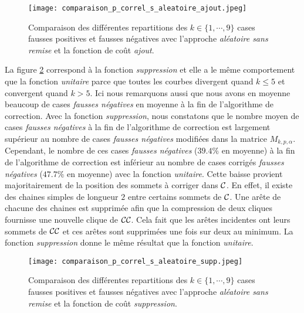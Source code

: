 \begin{figure}[htb!] 
\centering
\texttt{[image: comparaison\_p\_correl\_s\_aleatoire\_ajout.jpeg]}
\caption{ Comparaison des diff\'erentes repartitions des $k \in \{1,\cdots,9\}$ cases fausses positives et fausses n\'egatives avec l'approche {\em al\'eatoire sans remise} et la fonction de co\^ut {\em ajout}.  }
\label{comparaison_p_correl_s_aleatoire_ajout} 
\end{figure}

La figure \ref{comparaison_p_correl_s_aleatoire_supp} correspond \`a la fonction {\em suppression} et elle a le m\^eme comportement que la fonction {\em unitaire} parce que toutes les courbes divergent quand $k \le 5$ et convergent quand  $k > 5$. Ici nous remarquons aussi que nous avons en moyenne beaucoup de cases {\em fausses n\'egatives} en moyenne \`a la fin de l'algorithme de correction. 
Avec la fonction {\em suppression}, nous constatons que le nombre moyen de cases {\em fausses n\'egatives} \`a la fin de l'algorithme de correction est largement sup\'erieur au nombre de cases {\em fausses n\'egatives} modifi\'ees dans la matrice $M_{k,p,\alpha}$.
Cependant, le nombre de ces cases {\em fausses n\'egatives}  ($39.4\%$ en moyenne) \`a la fin de l'algorithme de correction est inf\'erieur au nombre de cases corrig\'es {\em fausses n\'egatives}  ($47.7\%$ en moyenne) avec la fonction {\em unitaire}. 
Cette baisse provient majoritairement de la position des sommets \`a corriger dans ${\cal C}$. 
En effet, il existe des chaines simples de longueur $2$ entre certains sommets de  ${\cal C}$.  Une ar\^ete de chacune des chaines est supprim\'ee afin que la compression de deux cliques fournisse une nouvelle clique de ${\cal CC}$. Cela fait que les ar\^etes incidentes ont leurs sommets de ${\cal CC}$ et ces ar\^etes sont supprim\'ees une fois sur deux au minimum. 
La fonction {\em suppression} donne le m\^eme r\'esultat que la fonction {\em unitaire}.

\begin{figure}[htb!] 
\centering
\texttt{[image: comparaison\_p\_correl\_s\_aleatoire\_supp.jpeg]}
\caption{ Comparaison des diff\'erentes repartitions des $k \in \{1,\cdots,9\}$ cases fausses positives et fausses n\'egatives avec l'approche {\em al\'eatoire sans remise} et la fonction de co\^ut {\em suppression}. }
\label{comparaison_p_correl_s_aleatoire_supp} 
\end{figure}

